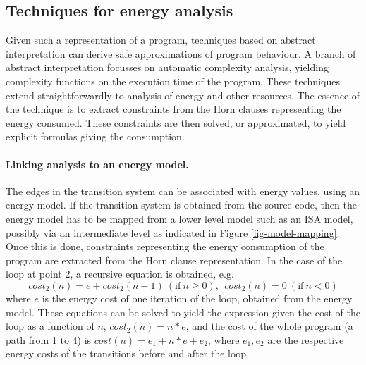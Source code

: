 %
%
%

\subsection{Techniques for energy analysis}

Given such a representation of a program, techniques based on abstract interpretation \cite{Cousot1977}
can derive safe approximations of program behaviour. A branch of abstract interpretation 
focusses on automatic complexity analysis, yielding complexity functions on the
execution time of the program.  These techniques extend straightforwardly to analysis of energy and
other resources. The essence of the technique is to extract constraints from the Horn clauses
representing the energy consumed. These constraints are then solved, or approximated, to yield explicit 
formulas giving the consumption.


 
\paragraph{Linking analysis to an energy model.} The edges in the transition system can be 
associated with energy values, using an energy model. If the transition system is obtained
from the source code, then the energy model has to be mapped from a lower level model
such as an ISA model, possibly via an intermediate level as indicated in Figure \ref{fig-model-mapping}. 
Once this is done, constraints
representing the energy consumption of the program are extracted from the Horn clause 
representation. In the case of the loop at point 2, a recursive equation is obtained, e.g.
\[ cost_2(n) = e + cost_2(n-1)~ (\mathrm{if}~n\ge 0), ~~cost_2(n) = 0 ~ (\mathrm{if}~n < 0) \]
where $e$ is the energy cost of one iteration of the loop, obtained from the energy model. These
equations can be solved to yield the expression given the cost of the loop as a function of $n$, 
$cost_2(n) = n*e$, and the cost of the whole 
program (a path from 1 to 4) is $cost(n) = e_1 + n*e + e_2$, where $e_1, e_2$ are the respective
energy costs of the transitions before and after the loop.


